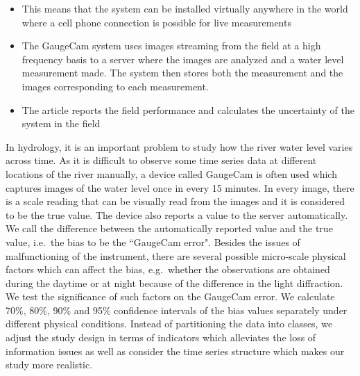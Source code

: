 \documentclass[]{article}
\begin{document}
\begin{itemize}
\item
  This means that the system can be installed virtually anywhere in the world where a cell phone connection is possible for live measurements
\item
  The GaugeCam system uses images streaming from the field at a high frequency basis to a server where the images are analyzed and a water level measurement made. The system then stores both the measurement and the images corresponding to each measurement.
\item
  The article reports the field performance and calculates the uncertainty of the system in the field
\end{itemize}

In hydrology, it is an important problem to study how the river water level varies across time. As it is difficult to observe some time series data at different locations of the river manually, a device called GaugeCam is often used which captures images of the water level once in every 15 minutes. In every image, there is a scale reading that can be visually read from the images and it is considered to be the true value. The device also reports a value to the server automatically. We call the difference between the automatically reported value and the true value, i.e.~the bias to be the ``GaugeCam error". Besides the issues of malfunctioning of the instrument, there are several possible micro-scale physical factors which can affect the bias, e.g.~whether the observations are obtained during the daytime or at night because of the difference in the light diffraction. We test the significance of such factors on the GaugeCam error. We calculate 70\%, 80\%, 90\% and 95\% confidence intervals of the bias values separately under different physical conditions.
Instead of partitioning the data into classes, we adjust the study design in terms of indicators which alleviates the loss of information issues as well as consider the time series structure which makes our study more realistic.
\end{document}
